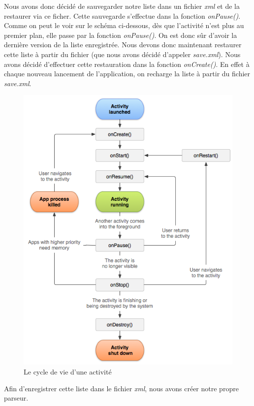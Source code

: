 \documentclass[a4paper,10pt]{article}
\begin{document}
Nous avons donc décidé de sauvegarder notre liste dans un fichier \emph{xml} et de la restaurer via ce ficher. Cette sauvegarde s'effectue dans la fonction \emph{onPause()}. Comme on peut le voir sur le schéma ci-dessous, dès que l'activité n'est plus au premier plan, elle passe par la fonction \emph{onPause()}. On est donc sûr d'avoir la dernière version de la liste enregistrée.
Nous devons donc maintenant restaurer cette liste à partir du fichier (que nous avons décidé d'appeler \textit{save.xml}). Nous avons décidé d'effectuer cette restauration dans la fonction \emph{onCreate()}. En effet à chaque nouveau lancement de l'application, on recharge la liste à partir du fichier \textit{save.xml}.
\begin{figure}[htpb]
	\center
	\includegraphics[scale=0.5]{Images/activity_lifecycle.png}
	\caption{Le cycle de vie d'une activité}
\end{figure}

Afin d'enregistrer cette liste dans le fichier \emph{xml}, nous avons créer notre propre parseur.
\end{document}
